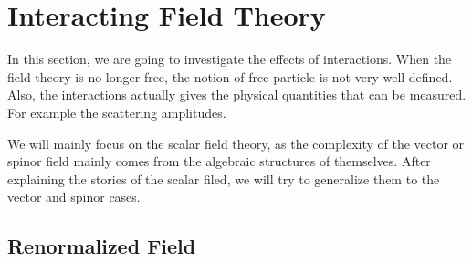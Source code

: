 \section{Interacting Field Theory}

In this section, we are going to investigate the effects of interactions.
When the field theory is no longer free, the notion of free particle is not very well defined.
Also, the interactions actually gives the physical quantities that can be measured. 
For example the scattering amplitudes.

We will mainly focus on the scalar field theory, as the complexity of the vector or spinor field mainly comes from the algebraic structures of themselves.
After explaining the stories of the scalar filed, we will try to generalize them to the vector and spinor cases.


\subsection{Renormalized Field}

